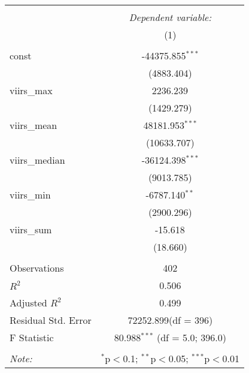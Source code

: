 \begin{table}[!htbp] \centering
\begin{tabular}{@{\extracolsep{5pt}}lc}
\\[-1.8ex]\hline
\hline \\[-1.8ex]
& \multicolumn{1}{c}{\textit{Dependent variable:}} \
\cr \cline{1-2}
\\[-1.8ex] & (1) \\
\hline \\[-1.8ex]
 const & -44375.855$^{***}$ \\
  & (4883.404) \\
 viirs_max & 2236.239$^{}$ \\
  & (1429.279) \\
 viirs_mean & 48181.953$^{***}$ \\
  & (10633.707) \\
 viirs_median & -36124.398$^{***}$ \\
  & (9013.785) \\
 viirs_min & -6787.140$^{**}$ \\
  & (2900.296) \\
 viirs_sum & -15.618$^{}$ \\
  & (18.660) \\
\hline \\[-1.8ex]
 Observations & 402 \\
 $R^2$ & 0.506 \\
 Adjusted $R^2$ & 0.499 \\
 Residual Std. Error & 72252.899(df = 396)  \\
 F Statistic & 80.988$^{***}$ (df = 5.0; 396.0) \\
\hline
\hline \\[-1.8ex]
\textit{Note:} & \multicolumn{1}{r}{$^{*}$p$<$0.1; $^{**}$p$<$0.05; $^{***}$p$<$0.01} \\
\end{tabular}
\end{table}